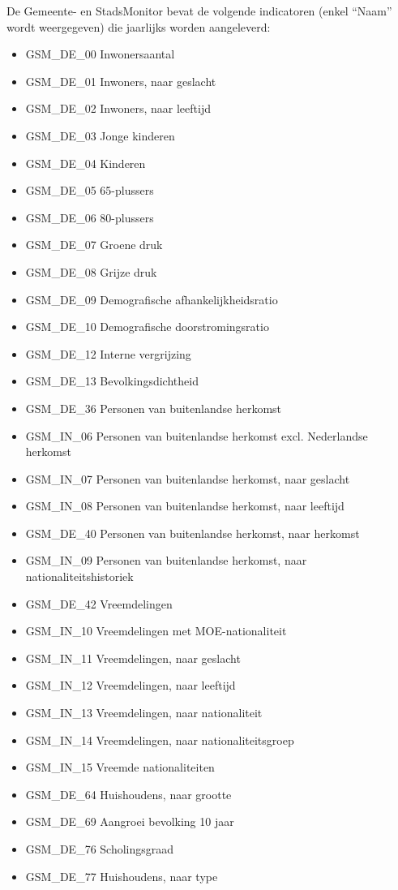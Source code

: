 \documentclass{SVnote}
\begin{document}
De Gemeente- en StadsMonitor bevat de volgende indicatoren (enkel ``Naam'' wordt weergegeven) die jaarlijks worden aangeleverd: 
\begin{itemize}
\item GSM\_DE\_00 Inwonersaantal
\item GSM\_DE\_01 Inwoners, naar geslacht
\item GSM\_DE\_02 Inwoners, naar leeftijd
\item GSM\_DE\_03 Jonge kinderen
\item GSM\_DE\_04 Kinderen
\item GSM\_DE\_05 65-plussers
\item GSM\_DE\_06 80-plussers
\item GSM\_DE\_07 Groene druk
\item GSM\_DE\_08 Grijze druk
\item GSM\_DE\_09 Demografische afhankelijkheidsratio
\item GSM\_DE\_10 Demografische doorstromingsratio
\item GSM\_DE\_12 Interne vergrijzing
\item GSM\_DE\_13 Bevolkingsdichtheid
\item GSM\_DE\_36 Personen van buitenlandse herkomst
\item GSM\_IN\_06 Personen van buitenlandse herkomst excl. Nederlandse herkomst
\item GSM\_IN\_07 Personen van buitenlandse herkomst, naar geslacht
\item GSM\_IN\_08 Personen van buitenlandse herkomst, naar leeftijd
\item GSM\_DE\_40 Personen van buitenlandse herkomst, naar herkomst
\item GSM\_IN\_09 Personen van buitenlandse herkomst, naar nationaliteitshistoriek
\item GSM\_DE\_42 Vreemdelingen
\item GSM\_IN\_10 Vreemdelingen met MOE-nationaliteit
\item GSM\_IN\_11 Vreemdelingen, naar geslacht
\item GSM\_IN\_12 Vreemdelingen, naar leeftijd
\item GSM\_IN\_13 Vreemdelingen, naar nationaliteit
\item GSM\_IN\_14 Vreemdelingen, naar nationaliteitsgroep
\item GSM\_IN\_15 Vreemde nationaliteiten
\item GSM\_DE\_64 Huishoudens, naar grootte
\item GSM\_DE\_69 Aangroei bevolking 10 jaar
\item GSM\_DE\_76 Scholingsgraad
\item GSM\_DE\_77 Huishoudens, naar type
\end{itemize}
\end{document}
